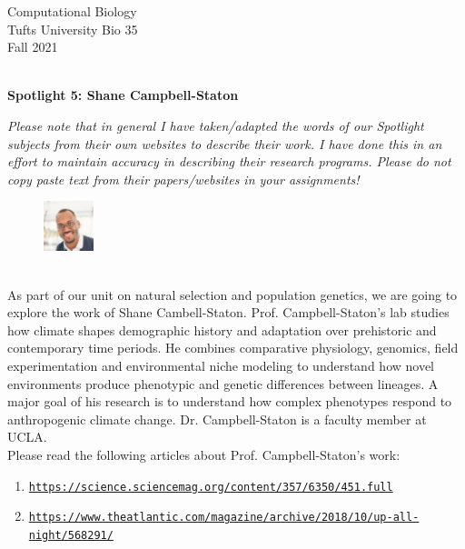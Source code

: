 \documentclass{article}
\begin{document}
\BeginAccSupp{}
\begin{flushright}
Computational Biology ~\\
Tufts University Bio 35 ~\\
Fall 2021 ~\\ ~\\
\end{flushright}
\begin{center}{\textbf{\Large{Spotlight 5: Shane Campbell-Staton}}}\end{center}

\textit{Please note that in general I have taken/adapted the words of our Spotlight subjects from their own websites to describe their work. I have done this in an effort to maintain accuracy in describing their research programs. Please do not copy paste text from their papers/websites in your assignments!}

\begin{figure}
\begin{center}
 \includegraphics[width=0.13\textwidth]{images/shane-campbell-staton.jpeg}
 \end{center}
\end{figure}
~\\ As part of our unit on natural selection and population genetics, we are going to explore the work of Shane Cambell-Staton. Prof. Campbell-Staton's lab studies how climate shapes demographic history and adaptation over prehistoric and contemporary time periods. He combines comparative physiology, genomics, field experimentation and environmental niche modeling to understand how novel environments produce phenotypic and genetic differences between lineages. A major goal of his research is to understand how complex phenotypes respond to anthropogenic climate change. Dr. Campbell-Staton is a faculty member at UCLA.
~\\ 

Please read the following articles about Prof. Campbell-Staton's work: 
\begin{enumerate}
\item \texttt{\href{https://science.sciencemag.org/content/357/6350/451.full}{https://science.sciencemag.org/content/357/6350/451.full}}
\item \texttt{\href{https://www.theatlantic.com/magazine/archive/2018/10/up-all-night/568291/}{https://www.theatlantic.com/magazine/archive/2018/10/up-all-night/568291/}}
\end{enumerate}
\end{document}
